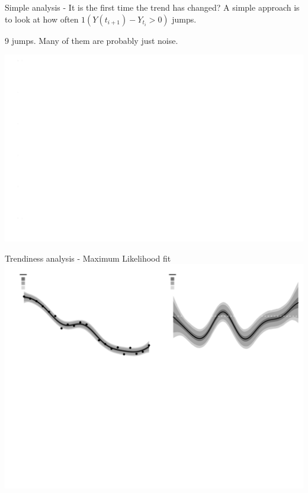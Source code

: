 \documentclass[ignorenonframetext,xcolor=pdflatex,table,dvipsnames,serif]{beamer}
\begin{document}
\begin{frame}{Simple analysis - It is the first time the trend has changed?}
A simple approach is to look at how often $1(Y(t_{i+1}) - Y_{t_i} > 0)$ jumps. 

9 jumps. Many of them are probably just noise.

\center\includegraphics[scale=0.45]{jumpPlot}
\end{frame}


\begin{frame}{Trendiness analysis - Maximum Likelihood fit}
\center\includegraphics[scale=0.47]{fitLogLik}
\end{frame}
\end{document}
